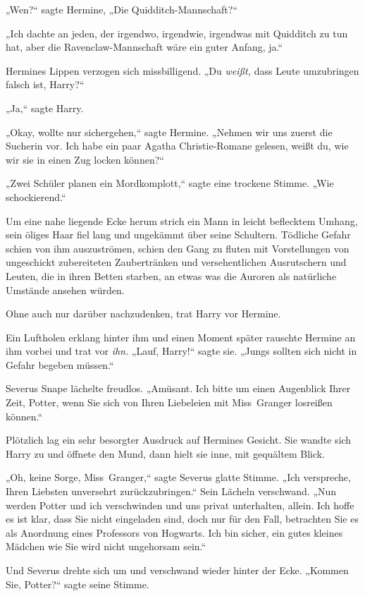 {„Wen?“ sagte Hermine, „Die Quidditch-Mannschaft?“

„Ich dachte an jeden, der irgendwo, irgendwie, irgendwas mit Quidditch zu tun hat, aber die Ravenclaw-Mannschaft wäre ein guter Anfang, ja.“

Hermines Lippen verzogen sich missbilligend. „Du \emph{weißt,} dass Leute umzubringen falsch ist, Harry?“

„Ja,“ sagte Harry.

„Okay, wollte nur sichergehen,“ sagte Hermine. „Nehmen wir uns zuerst die Sucherin vor. Ich habe ein paar Agatha Christie-Romane gelesen, weißt du, wie wir sie in einen Zug locken können?“

„Zwei Schüler planen ein Mordkomplott,“ sagte eine trockene Stimme. „Wie schockierend.“

Um eine nahe liegende Ecke herum strich ein Mann in leicht beflecktem Umhang, sein öliges Haar fiel lang und ungekämmt über seine Schultern. Tödliche Gefahr schien von ihm auszuströmen, schien den Gang zu fluten mit Vorstellungen von ungeschickt zubereiteten Zaubertränken und versehentlichen Ausrutschern und Leuten, die in ihren Betten starben, an etwas was die Auroren als natürliche Umstände ansehen würden.

Ohne auch nur darüber nachzudenken, trat Harry vor Hermine.

Ein Luftholen erklang hinter ihm und einen Moment später rauschte Hermine an ihm vorbei und trat vor \emph{ihn.} „Lauf, Harry!“ sagte sie. „Jungs sollten sich nicht in Gefahr begeben müssen.“

Severus Snape lächelte freudlos. „Amüsant. Ich bitte um einen Augenblick Ihrer Zeit, Potter, wenn Sie sich von Ihren Liebeleien mit Miss~Granger losreißen können.“

Plötzlich lag ein sehr besorgter Ausdruck auf Hermines Gesicht. Sie wandte sich Harry zu und öffnete den Mund, dann hielt sie inne, mit gequältem Blick.

„Oh, keine Sorge, Miss~Granger,“ sagte Severus glatte Stimme. „Ich verspreche, Ihren Liebsten unversehrt zurückzubringen.“ Sein Lächeln verschwand. „Nun werden Potter und ich verschwinden und uns privat unterhalten, allein. Ich hoffe es ist klar, dass Sie nicht eingeladen sind, doch nur für den Fall, betrachten Sie es als Anordnung eines Professors von Hogwarts. Ich bin sicher, ein gutes kleines Mädchen wie Sie wird nicht ungehorsam sein.“

Und Severus drehte sich um und verschwand wieder hinter der Ecke. „Kommen Sie, Potter?“ sagte seine Stimme.

}
